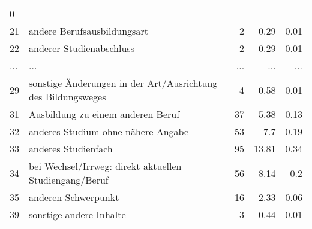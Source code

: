 \begin{longtable}{lXrrr}
          \num[round-mode=places,round-precision=2]{0} \\
        21 & \multicolumn{1}{X}{andere Berufsausbildungsart} & %
          \num{2} &
          \num[round-mode=places,round-precision=2]{0,29} &
          \num[round-mode=places,round-precision=2]{0,01} \\
        22 & \multicolumn{1}{X}{anderer Studienabschluss} & %
          \num{2} &
          \num[round-mode=places,round-precision=2]{0,29} &
          \num[round-mode=places,round-precision=2]{0,01} \\
       ... & ... & ... & ... & ... \\
        29 & \multicolumn{1}{X}{sonstige Änderungen in der Art/Ausrichtung des Bildungsweges} & %
          \num{4} &
          \num[round-mode=places,round-precision=2]{0,58} &
          \num[round-mode=places,round-precision=2]{0,01} \\

        31 & \multicolumn{1}{X}{Ausbildung zu einem anderen Beruf} & %
          \num{37} &
          \num[round-mode=places,round-precision=2]{5,38} &
          \num[round-mode=places,round-precision=2]{0,13} \\

        32 & \multicolumn{1}{X}{anderes Studium ohne nähere Angabe} & %
          \num{53} &
          \num[round-mode=places,round-precision=2]{7,7} &
          \num[round-mode=places,round-precision=2]{0,19} \\

        33 & \multicolumn{1}{X}{anderes Studienfach} & %
          \num{95} &
          \num[round-mode=places,round-precision=2]{13,81} &
          \num[round-mode=places,round-precision=2]{0,34} \\

        34 & \multicolumn{1}{X}{bei Wechsel/Irrweg: direkt aktuellen Studiengang/Beruf} & %
          \num{56} &
          \num[round-mode=places,round-precision=2]{8,14} &
          \num[round-mode=places,round-precision=2]{0,2} \\

        35 & \multicolumn{1}{X}{anderen Schwerpunkt} & %
          \num{16} &
          \num[round-mode=places,round-precision=2]{2,33} &
          \num[round-mode=places,round-precision=2]{0,06} \\

        39 & \multicolumn{1}{X}{sonstige andere Inhalte} & %
          \num{3} &
          \num[round-mode=places,round-precision=2]{0,44} &
          \num[round-mode=places,round-precision=2]{0,01} \\


\end{longtable}
